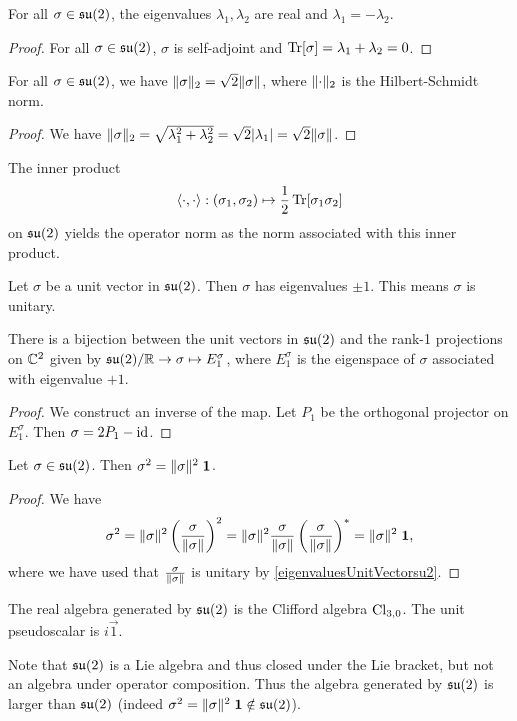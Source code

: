\begin{lemma} \label{su2Eigenvalues}
For all $\sigma\in \operatorname{\mathfrak{su}}(2)$, the eigenvalues $\lambda_1, \lambda_2$ are real and $\lambda_1 = -\lambda_2$.
\end{lemma}
\begin{proof}
For all $\sigma\in \operatorname{\mathfrak{su}}(2)$, $\sigma$ is self-adjoint and $\operatorname{Tr}[\sigma] = \lambda_1 + \lambda_2 = 0$. 
\end{proof}
\begin{corollary}
For all $\sigma\in \operatorname{\mathfrak{su}}(2)$, we have $\lVert\sigma\rVert_{2} = \sqrt{2}\lVert\sigma\rVert$, where $\lVert\cdot\rVert_2$ is the Hilbert-Schmidt norm.
\end{corollary}
\begin{proof}
We have $\lVert\sigma\rVert_{2} = \sqrt{\lambda_1^2 + \lambda_2^2} = \sqrt{2}|\lambda_1| = \sqrt{2}\lVert\sigma\rVert$.
\end{proof}
\begin{corollary}
The inner product
\[ \left\langle \cdot,\cdot \right\rangle: (\sigma_1,\sigma_2) \mapsto \frac{1}{2}\operatorname{Tr}[\sigma_1\sigma_2] \]
on $\operatorname{\mathfrak{su}}(2)$ yields the operator norm as the norm associated with this inner product.
\end{corollary}
\begin{corollary} \label{eigenvaluesUnitVectorsu2}
Let $\sigma$ be a unit vector in $\operatorname{\mathfrak{su}}(2)$. Then $\sigma$ has eigenvalues $\pm 1$. This means $\sigma$ is unitary.
\end{corollary}
\begin{corollary} \label{BlochBijection}
There is a bijection between the unit vectors in $\operatorname{\mathfrak{su}}(2)$ and the rank-1 projections on $\mathbb{C}^2$ given by $\operatorname{\mathfrak{su}}(2)/\mathbb{R} \to \sigma\mapsto E^\sigma_{1}$, where $E^\sigma_{1}$ is the eigenspace of $\sigma$ associated with eigenvalue $+1$.
\end{corollary}
\begin{proof}
We construct an inverse of the map. Let $P_1$ be the orthogonal projector on $E^\sigma_{1}$. Then $\sigma = 2P_1 - \operatorname{id}$.
\end{proof}


\begin{proposition}
Let $\sigma\in\operatorname{\mathfrak{su}}(2)$. Then $\sigma^2 = \lVert\sigma\rVert^2\;\boldsymbol{\mathrm{1}}$.
\end{proposition}
\begin{proof}
We have 
\[ \sigma^2 = \lVert\sigma\rVert^2 \left(\frac{\sigma}{\lVert\sigma\rVert}\right)^2 = \lVert\sigma\rVert^2 \frac{\sigma}{\lVert\sigma\rVert}\left(\frac{\sigma}{\lVert\sigma\rVert}\right)^* = \lVert\sigma\rVert^2\;\boldsymbol{\mathrm{1}}, \]
where we have used that $\frac{\sigma}{\lVert\sigma\rVert}$ is unitary by \ref{eigenvaluesUnitVectorsu2}.
\end{proof}
\begin{corollary}
The real algebra generated by $\operatorname{\mathfrak{su}}(2)$ is the Clifford algebra $\operatorname{Cl}_{3,0}$. The unit pseudoscalar is $i\vec{1}$.
\end{corollary}
Note that $\operatorname{\mathfrak{su}}(2)$ is a Lie algebra and thus closed under the Lie bracket, but not an algebra under operator composition. Thus the algebra generated by $\operatorname{\mathfrak{su}}(2)$ is larger than $\operatorname{\mathfrak{su}}(2)$ (indeed $\sigma^2 = \lVert\sigma\rVert^2\;\boldsymbol{\mathrm{1}}\notin \operatorname{\mathfrak{su}}(2)$).

